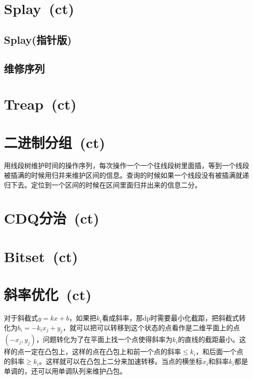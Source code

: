 \section{Splay\ \small(ct)}
    \subsection*{Splay(指针版)}
    \subsection*{维修序列}

\section{Treap\ \small(ct)}

\section{二进制分组\ \small(ct)}
    用线段树维护时间的操作序列，每次操作一个一个往线段树里面插，等到一个线段被插满的时候用归并来维护区间的信息。查询的时候如果一个线段没有被插满就递归下去。定位到一个区间的时候在区间里面归并出来的信息二分。

\section{CDQ分治\ \small(ct)}

\section{Bitset\ \small(ct)}

\section{斜率优化\ \small(ct)}
    对于斜截式$ y = k x + b $，如果把$ k_i $看成斜率，那dp时需要最小化截距，把斜截式转化为$ b_i = - k_i x_j + y_j $，就可以把可以转移到这个状态的点看作是二维平面上的点$ (- x_j, y_j) $，问题转化为了在平面上找一个点使得斜率为$ k_i $的直线的截距最小。这样的点一定在凸包上，这样的点在凸包上和前一个点的斜率$ \leq k_i$，和后面一个点的斜率$ \geq k_i $。这样就可以在凸包上二分来加速转移。当点的横坐标$ x_i $和斜率$ k_i $都是单调的，还可以用单调队列来维护凸包。
